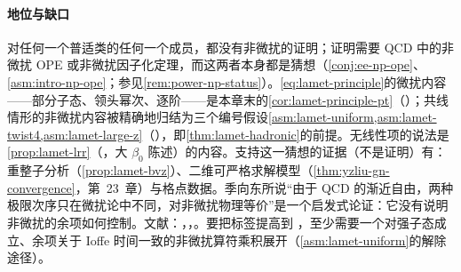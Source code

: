 \paragraph{地位与缺口}
对任何一个普适类的任何一个成员，都没有非微扰的证明；证明需要 QCD 中的非微扰 OPE 或非微扰因子化定理，而这两者本身都是猜想（\cref{conj:ee-np-ope}、\cref{asm:intro-np-ope}；参见\cref{rem:power-np-status}）。\cref{eq:lamet-principle}的微扰内容——部分子态、领头幂次、逐阶——是本章末的\cref{cor:lamet-principle-pt}（\tagA）；共线情形的非微扰内容被精确地归结为三个编号假设\cref{asm:lamet-uniform,asm:lamet-twist4,asm:lamet-large-z}（\tagC），即\cref{thm:lamet-hadronic}的前提。无线性项的说法是\cref{prop:lamet-lrr}（\tagP，大 $\beta_0$ 陈述）的内容。支持这一猜想的证据（不是证明）有：重整子分析（\cref{prop:lamet-bvz}）、二维可严格求解模型（\cref{thm:yzliu-gn-convergence}，第~23~章）与格点数据。季向东所说“由于 QCD 的渐近自由，两种极限次序只在微扰论中不同，对非微扰物理等价”\cite{Ji:2024oka}是一个启发式论证：它没有说明非微扰的余项如何控制。文献：\cite{Ji2013,Ji:2014gla}，\cite[第~II--III~节]{JiEtAl2021}，\cite{Ji:2020byp,Ji:2024oka}。要把标签提高到 \tagA，至少需要一个对强子态成立、余项关于 Ioffe 时间一致的非微扰算符乘积展开（\cref{asm:lamet-uniform}的解除途径）。


